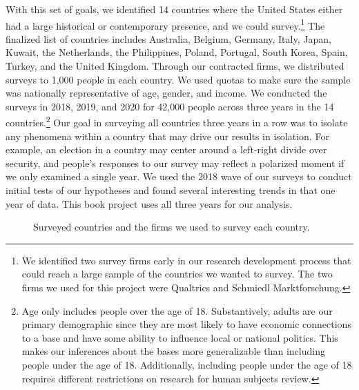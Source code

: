 With this set of goals, we identified 14 countries where the United States either had a large historical or contemporary presence, and we could survey.\footnote{We identified two survey firms early in our research development process that could reach a large sample of the countries we wanted to survey. The two firms we used for this project were Qualtrics and Schmiedl Marktforschung.} The finalized list of countries includes Australia, Belgium, Germany, Italy, Japan, Kuwait, the Netherlands, the Philippines, Poland, Portugal, South Korea, Spain, Turkey, and the United Kingdom. Through our contracted firms, we distributed surveys to 1,000 people in each country. We used quotas to make sure the sample was nationally representative of age, gender, and income. We conducted the surveys in 2018, 2019, and 2020 for 42,000 people across three years in the 14 countries.\footnote{Age only includes people over the age of 18. Substantively, adults are our primary demographic since they are most likely to have economic connections to a base and have some ability to influence local or national politics. This makes our inferences about the bases more generalizable than including people under the age of 18. Additionally, including people under the age of 18 requires different restrictions on research for human subjects review.} Our goal in surveying all countries three years in a row was to isolate any phenomena within a country that may drive our results in isolation. For example, an election in a country may center around a left-right divide over security, and people's responses to our survey may reflect a polarized moment if we only examined a single year. We used the 2018 wave of our surveys to conduct initial tests of our hypotheses and found several interesting trends in that one year of data.\cite{Allen2020} This book project uses all three years for our analysis. 

\begin{figure}[t]
	\hspace*{-1cm}\centering{}
	\caption{Surveyed countries and the firms we used to survey each country.}
	\label{fig:surveycoverage}
\end{figure}	

